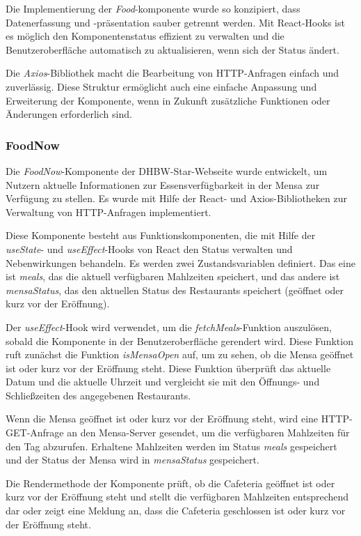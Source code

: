 Die Implementierung der \emph{Food}-komponente wurde so konzipiert, dass Datenerfassung und -präsentation sauber getrennt werden. Mit React-Hooks ist es möglich den Komponentenstatus effizient zu verwalten und die Benutzeroberfläche automatisch zu aktualisieren, wenn sich der Status ändert.

Die \emph{Axios}-Bibliothek macht die Bearbeitung von HTTP-Anfragen einfach und zuverlässig. Diese Struktur ermöglicht auch eine einfache Anpassung und Erweiterung der Komponente, wenn in Zukunft zusätzliche Funktionen oder Änderungen erforderlich sind.

\subsubsection{FoodNow}
Die \emph{FoodNow}-Komponente der DHBW-Star-Webseite wurde entwickelt, um Nutzern aktuelle Informationen zur Essensverfügbarkeit in der Mensa zur Verfügung zu stellen. Es wurde mit Hilfe der React- und Axios-Bibliotheken zur Verwaltung von HTTP-Anfragen implementiert.

Diese Komponente besteht aus Funktionskomponenten, die mit Hilfe der \emph{useState}- und \emph{useEffect}-Hooks von React den Status verwalten und Nebenwirkungen behandeln. Es werden zwei Zustandsvariablen definiert. Das eine ist \emph{meals}, das die aktuell verfügbaren Mahlzeiten speichert, und das andere ist \emph{mensaStatus}, das den aktuellen Status des Restaurants speichert (geöffnet oder kurz vor der Eröffnung).

Der \emph{useEffect}-Hook wird verwendet, um die \emph{fetchMeals}-Funktion auszulösen, sobald die Komponente in der Benutzeroberfläche gerendert wird. Diese Funktion ruft zunächst die Funktion \emph{isMensaOpen} auf, um zu sehen, ob die Mensa geöffnet ist oder kurz vor der Eröffnung steht. Diese Funktion überprüft das aktuelle Datum und die aktuelle Uhrzeit und vergleicht sie mit den Öffnungs- und Schließzeiten des angegebenen Restaurants.

Wenn die Mensa geöffnet ist oder kurz vor der Eröffnung steht, wird eine HTTP-GET-Anfrage an den Mensa-Server gesendet, um die verfügbaren Mahlzeiten für den Tag abzurufen. Erhaltene Mahlzeiten werden im Status \emph{meals} gespeichert und der Status der Mensa wird in \emph{mensaStatus} gespeichert.

Die Rendermethode der Komponente prüft, ob die Cafeteria geöffnet ist oder kurz vor der Eröffnung steht und stellt die verfügbaren Mahlzeiten entsprechend dar oder zeigt eine Meldung an, dass die Cafeteria geschlossen ist oder kurz vor der Eröffnung steht.

